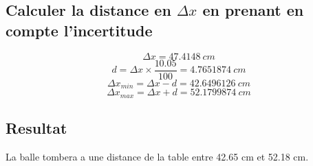 \documentclass{article}
\begin{document}
                \subsection{Calculer la distance en $\Delta x$ en prenant en compte l'incertitude}
                    \setcounter{equation}{0}
                    \vspace{2mm}
                    \begin{equation}
                       \Delta x = 47.4148 \ cm
                    \end{equation}
                    \vspace{2mm}
                    \begin{equation}
                        d = \Delta x \times \frac{10.05}{100} = 4.7651874 \ cm
                    \end{equation}
                    \vspace{2mm}
                    \begin{equation}
                        \Delta x_{min} = \Delta x - d = 42.6496126
 \ cm
                    \end{equation}
                    \vspace{1mm}
                    \begin{equation}
                        \Delta x_{max} = \Delta x + d = 52.1799874
 \ cm
                    \end{equation}
                    \vspace{2mm}
                \subsection{Resultat}
                    \hspace{11mm} La balle tombera a une distance de la table entre 42.65 cm et 52.18 cm.
\end{document}
